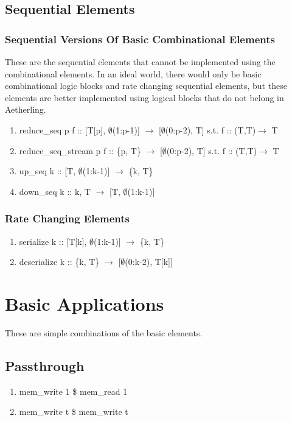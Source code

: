 \documentclass[11pt,fleqn]{article}
\numberwithin{equation}{subsection}
\begin{document}
\subsection{Sequential Elements}

\subsubsection{Sequential Versions Of Basic Combinational Elements}
These are the sequential elements that cannot be implemented using the
combinational elements. In an ideal world, there would only be basic
combinational logic blocks and rate changing sequential elements, but these
elements are better implemented using logical blocks that do not belong in
Aetherling.
\begin{enumerate}
    \item reduce\_seq p f :: [T[p], $\emptyset$(1:p-1)] $\rightarrow$ [$\emptyset$(0:p-2), T]
        \subitem s.t. f :: (T,T)$\rightarrow$ T
    \item reduce\_seq\_stream p f :: \{p, T\} $\rightarrow$ [$\emptyset$(0:p-2), T]
        \subitem s.t. f :: (T,T)$\rightarrow$ T
    \item up\_seq k :: [T, $\emptyset$(1:k-1)] $\rightarrow$ \{k, T\}
    \item down\_seq k :: {k, T} $\rightarrow$ [T, $\emptyset$(1:k-1)]
\end{enumerate}

\subsubsection{Rate Changing Elements}

\begin{enumerate}
    \item serialize k :: [T[k], $\emptyset$(1:k-1)] $\rightarrow$ \{k, T\}
    \item deserialize k :: \{k, T\} $\rightarrow$ [$\emptyset$(0:k-2), T[k]]
\end{enumerate}

\section{Basic Applications}
These are simple combinations of the basic elements.

\subsection{Passthrough}
\begin{enumerate}
    \item mem\_write 1 \$ mem\_read 1
    \item mem\_write t \$ mem\_write t 
\end{enumerate}
\end{document}
